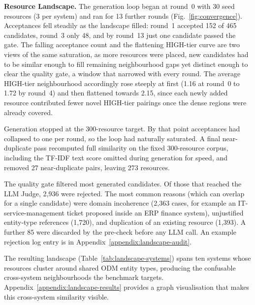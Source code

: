\documentclass[10pt,twocolumn]{article}
\begin{document}
\textbf{Resource Landscape.} The generation loop began at round~0 with 30 seed resources (3 per system) and ran for 13 further rounds (Fig.~\ref{fig:convergence}). Acceptances fell steadily as the landscape filled: round~1 accepted 152 of 465 candidates, round~3 only 48, and by round~13 just one candidate passed the gate. The falling acceptance count and the flattening HIGH-tier curve are two views of the same saturation, as more resources were placed, new candidates had to be similar enough to fill remaining neighbourhood gaps yet distinct enough to clear the quality gate, a window that narrowed with every round. The average HIGH-tier neighbourhood accordingly rose steeply at first (1.16 at round~0 to 1.72 by round~4) and then flattened towards 2.15, since each newly added resource contributed fewer novel HIGH-tier pairings once the dense regions were already covered. 

Generation stopped at the 300-resource target. By that point acceptances had collapsed to one per round, so the loop had naturally saturated. A final near-duplicate pass recomputed full similarity on the fixed 300-resource corpus, including the TF-IDF text score omitted during generation for speed, and removed 27 near-duplicate pairs, leaving 273 resources.



The quality gate filtered most generated candidates. Of those that reached the LLM Judge, 2{,}936 were rejected. The most common reasons (which can overlap for a single candidate) were domain incoherence (2{,}363 cases, for example an IT-service-management ticket proposed inside an ERP finance system), unjustified entity-type references (1{,}720), and duplication of an existing resource (1{,}393). A further 85 were discarded by the pre-check before any LLM call. An example rejection log entry is in Appendix~\ref{appendix:landscape-audit}.

The resulting landscape (Table~\ref{tab:landscape-systems}) spans ten systems whose resources cluster around shared ODM entity types, producing the confusable cross-system neighbourhoods the benchmark targets. Appendix~\ref{appendix:landscape-results} provides a graph visualisation that makes this cross-system similarity visible. 
\end{document}

